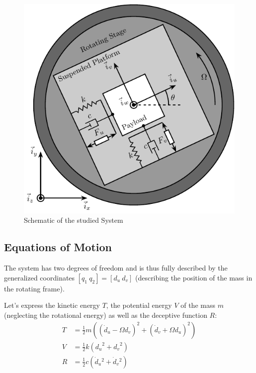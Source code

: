 \documentclass{ISMA_USD2020}
\begin{document}
\begin{figure}[htbp]
\centering
\includegraphics[scale=1]{figs/system.pdf}
\caption{\label{fig:system}Schematic of the studied System}
\end{figure}

\subsection{Equations of Motion}
\label{sec:org647b64d}
The system has two degrees of freedom and is thus fully described by the generalized coordinates \([q_1\ q_2] = [d_u\ d_v]\) (describing the position of the mass in the rotating frame).

Let's express the kinetic energy \(T\), the potential energy \(V\) of the mass \(m\) (neglecting the rotational energy) as well as the deceptive function \(R\):
\begin{subequations}
\label{eq:energy_functions_lagrange}
  \begin{align}
    T & = \frac{1}{2} m \left( \left( \dot{d}_u - \Omega d_v \right)^2 + \left( \dot{d}_v + \Omega d_u \right)^2 \right) \\
    V & = \frac{1}{2} k \left( {d_u}^2 + {d_v}^2 \right) \\
    R & = \frac{1}{2} c \left( \dot{d}_u{}^2 + \dot{d}_v{}^2 \right)
  \end{align}
\end{subequations}
\end{document}
